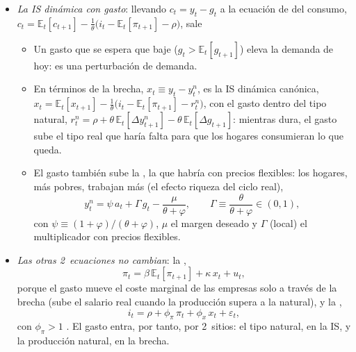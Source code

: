 \documentclass[11pt]{article}
\begin{document}
\begin{itemize}
\item \emph{La IS dinámica con gasto}: llevando $c_t=y_t-g_t$ a la ecuación de  del consumo, $c_t=\mathbb{E}_t[c_{t+1}]-\frac{1}{\theta}\big(i_t-\mathbb{E}_t[\pi_{t+1}]-\rho\big)$, sale
  \begin{itemize}
  \item Un gasto que se espera que baje ($g_t>\mathbb{E}_t[g_{t+1}]$) eleva la demanda de hoy: es una perturbación de demanda.
  \item En términos de la brecha, $x_t\equiv y_t-y^n_t$, es la IS dinámica canónica, $x_t=\mathbb{E}_t[x_{t+1}]-\frac{1}{\theta}\big(i_t-\mathbb{E}_t[\pi_{t+1}]-r^n_t\big)$, con el gasto dentro del tipo natural, $r^n_t=\rho+\theta\,\mathbb{E}_t[\Delta y^n_{t+1}]-\theta\,\mathbb{E}_t[\Delta g_{t+1}]$: mientras dura, el gasto sube el tipo real que haría falta para que los hogares consumieran lo que queda.
  \item El gasto también sube la , la que habría con precios flexibles: los hogares, más pobres, trabajan más (el efecto riqueza del ciclo real),
    \begin{equation}\label{eq:natural-gasto}
    y^n_t=\psi\,a_t+\Gamma\,g_t-\frac{\mu}{\theta+\varphi},\qquad\Gamma\equiv\frac{\theta}{\theta+\varphi}\in(0,1),
    \end{equation}
    con $\psi\equiv(1+\varphi)/(\theta+\varphi)$, $\mu$ el margen deseado y $\Gamma$ (local) el multiplicador con precios flexibles.
  \end{itemize}
\item \emph{Las otras 2~ecuaciones no cambian}: la ,
  \begin{equation}\label{eq:nkpc-gasto}
  \pi_t=\beta\,\mathbb{E}_t[\pi_{t+1}]+\kappa\,x_t+u_t,
  \end{equation}
  porque el gasto mueve el coste marginal de las empresas solo a través de la brecha (sube el salario real cuando la producción supera a la natural), y la ,
  \begin{equation}\label{eq:taylor-gasto}
  i_t=\rho+\phi_\pi\,\pi_t+\phi_x\,x_t+\varepsilon_t,
  \end{equation}
  con $\phi_\pi>1$  . El gasto entra, por tanto, por 2~sitios: el tipo natural, en la IS, y la producción natural, en la brecha.

\end{itemize}
\end{document}
